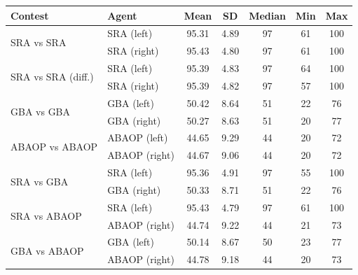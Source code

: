 \begin{tabular}{|l|l|c|c|c|c|c|}
\hline
\rowcolor{blue!20}
Contest & Agent & Mean & SD & Median & Min & Max \\ \hline
\multirow{2}{*}{SRA vs SRA} & SRA (left) & 95.31 & 4.89 & 97 & 61 & 100 \\ \cline{2-7}
 & SRA (right) & 95.43 & 4.80 & 97 & 61 & 100 \\ \hline
\multirow{2}{*}{SRA vs SRA (diff.)} & SRA (left) & 95.39 & 4.83 & 97 & 64 & 100 \\ \cline{2-7}
 & SRA (right) & 95.39 & 4.82 & 97 & 57 & 100 \\ \hline
\multirow{2}{*}{GBA vs GBA} & GBA (left) & 50.42 & 8.64 & 51 & 22 & 76 \\ \cline{2-7}
 & GBA (right) & 50.27 & 8.63 & 51 & 20 & 77 \\ \hline
\multirow{2}{*}{ABAOP vs ABAOP} & ABAOP (left) & 44.65 & 9.29 & 44 & 20 & 72 \\ \cline{2-7}
 & ABAOP (right) & 44.67 & 9.06 & 44 & 20 & 72 \\ \hline
\multirow{2}{*}{SRA vs GBA} & SRA (left) & 95.36 & 4.91 & 97 & 55 & 100 \\ \cline{2-7}
 & GBA (right) & 50.33 & 8.71 & 51 & 22 & 76 \\ \hline
\multirow{2}{*}{SRA vs ABAOP} & SRA (left) & 95.43 & 4.79 & 97 & 61 & 100 \\ \cline{2-7}
 & ABAOP (right) & 44.74 & 9.22 & 44 & 21 & 73 \\ \hline
\multirow{2}{*}{GBA vs ABAOP} & GBA (left) & 50.14 & 8.67 & 50 & 23 & 77 \\ \cline{2-7}
 & ABAOP (right) & 44.78 & 9.18 & 44 & 20 & 73 \\ \hline
\end{tabular}
